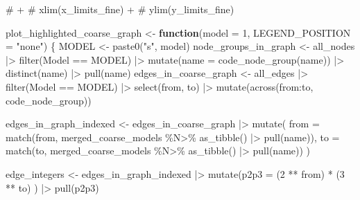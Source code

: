 \documentclass[
  letterpaper,
  DIV=11,
  numbers=noendperiod]{scrartcl}
\newenvironment{Shaded}{\begin{snugshade}}{\end{snugshade}}
\newcommand{\AttributeTok}[1]{\textcolor[rgb]{0.40,0.45,0.13}{#1}}
\newcommand{\CommentTok}[1]{\textcolor[rgb]{0.37,0.37,0.37}{#1}}
\newcommand{\ControlFlowTok}[1]{\textcolor[rgb]{0.00,0.23,0.31}{\textbf{#1}}}
\newcommand{\DecValTok}[1]{\textcolor[rgb]{0.68,0.00,0.00}{#1}}
\newcommand{\FunctionTok}[1]{\textcolor[rgb]{0.28,0.35,0.67}{#1}}
\newcommand{\NormalTok}[1]{\textcolor[rgb]{0.00,0.23,0.31}{#1}}
\newcommand{\OtherTok}[1]{\textcolor[rgb]{0.00,0.23,0.31}{#1}}
\newcommand{\SpecialCharTok}[1]{\textcolor[rgb]{0.37,0.37,0.37}{#1}}
\newcommand{\StringTok}[1]{\textcolor[rgb]{0.13,0.47,0.30}{#1}}
\begin{document}
\begin{Shaded}
\begin{Highlighting}[]
\CommentTok{\# +}
\CommentTok{\#     xlim(x\_limits\_fine) +}
\CommentTok{\#     ylim(y\_limits\_fine)}



\NormalTok{plot\_highlighted\_coarse\_graph }\OtherTok{\textless{}{-}} \ControlFlowTok{function}\NormalTok{(}\AttributeTok{model =} \DecValTok{1}\NormalTok{, }\AttributeTok{LEGEND\_POSITION =} \StringTok{"none"}\NormalTok{) \{}
\NormalTok{    MODEL }\OtherTok{\textless{}{-}} \FunctionTok{paste0}\NormalTok{(}\StringTok{"s"}\NormalTok{, model)}
\NormalTok{    node\_groups\_in\_graph }\OtherTok{\textless{}{-}}\NormalTok{ all\_nodes }\SpecialCharTok{|\textgreater{}} 
        \FunctionTok{filter}\NormalTok{(Model }\SpecialCharTok{==}\NormalTok{ MODEL) }\SpecialCharTok{|\textgreater{}} 
        \FunctionTok{mutate}\NormalTok{(}\AttributeTok{name =} \FunctionTok{code\_node\_group}\NormalTok{(name)) }\SpecialCharTok{|\textgreater{}} 
        \FunctionTok{distinct}\NormalTok{(name) }\SpecialCharTok{|\textgreater{}} 
        \FunctionTok{pull}\NormalTok{(name) }
\NormalTok{    edges\_in\_coarse\_graph }\OtherTok{\textless{}{-}}\NormalTok{ all\_edges }\SpecialCharTok{|\textgreater{}} 
        \FunctionTok{filter}\NormalTok{(Model }\SpecialCharTok{==}\NormalTok{ MODEL) }\SpecialCharTok{|\textgreater{}} 
        \FunctionTok{select}\NormalTok{(from, to) }\SpecialCharTok{|\textgreater{}} 
        \FunctionTok{mutate}\NormalTok{(}\FunctionTok{across}\NormalTok{(from}\SpecialCharTok{:}\NormalTok{to, code\_node\_group))}
    
\NormalTok{    edges\_in\_graph\_indexed }\OtherTok{\textless{}{-}} 
\NormalTok{        edges\_in\_coarse\_graph }\SpecialCharTok{|\textgreater{}} 
        \FunctionTok{mutate}\NormalTok{(}
            \AttributeTok{from =} \FunctionTok{match}\NormalTok{(from, merged\_coarse\_models }\SpecialCharTok{\%N\textgreater{}\%} \FunctionTok{as\_tibble}\NormalTok{() }\SpecialCharTok{|\textgreater{}} \FunctionTok{pull}\NormalTok{(name)),}
            \AttributeTok{to =} \FunctionTok{match}\NormalTok{(to, merged\_coarse\_models }\SpecialCharTok{\%N\textgreater{}\%} \FunctionTok{as\_tibble}\NormalTok{() }\SpecialCharTok{|\textgreater{}} \FunctionTok{pull}\NormalTok{(name))}
\NormalTok{        )}
    
\NormalTok{    edge\_integers }\OtherTok{\textless{}{-}} 
\NormalTok{        edges\_in\_graph\_indexed }\SpecialCharTok{|\textgreater{}} 
        \FunctionTok{mutate}\NormalTok{(}\AttributeTok{p2p3 =}\NormalTok{ (}\DecValTok{2} \SpecialCharTok{**}\NormalTok{ from) }\SpecialCharTok{*}\NormalTok{ (}\DecValTok{3} \SpecialCharTok{**}\NormalTok{ to) ) }\SpecialCharTok{|\textgreater{}} 
        \FunctionTok{pull}\NormalTok{(p2p3)}
    

\end{Highlighting}
\end{Shaded}
\end{document}

